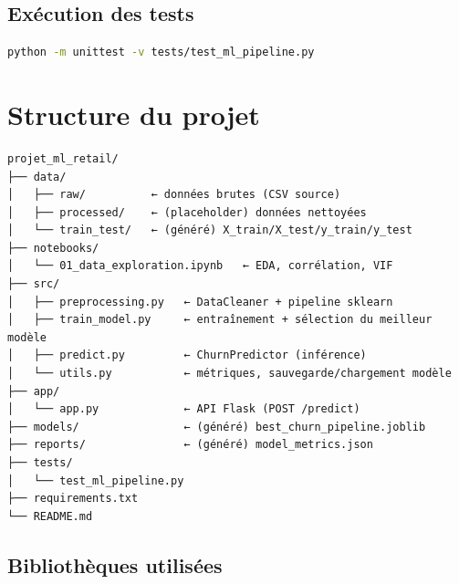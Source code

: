 \documentclass[11pt,a4paper]{article}
\begin{document}
\subsection{Exécution des tests}

\begin{lstlisting}[language=bash, caption=Commande d'exécution des tests]
python -m unittest -v tests/test_ml_pipeline.py
\end{lstlisting}

\section{Structure du projet}

\begin{tcolorbox}[title=Arborescence du projet]
\begin{verbatim}
projet_ml_retail/
├── data/
│   ├── raw/          ← données brutes (CSV source)
│   ├── processed/    ← (placeholder) données nettoyées
│   └── train_test/   ← (généré) X_train/X_test/y_train/y_test
├── notebooks/
│   └── 01_data_exploration.ipynb   ← EDA, corrélation, VIF
├── src/
│   ├── preprocessing.py   ← DataCleaner + pipeline sklearn
│   ├── train_model.py     ← entraînement + sélection du meilleur modèle
│   ├── predict.py         ← ChurnPredictor (inférence)
│   └── utils.py           ← métriques, sauvegarde/chargement modèle
├── app/
│   └── app.py             ← API Flask (POST /predict)
├── models/                ← (généré) best_churn_pipeline.joblib
├── reports/               ← (généré) model_metrics.json
├── tests/
│   └── test_ml_pipeline.py
├── requirements.txt
└── README.md
\end{verbatim}
\end{tcolorbox}

\subsection{Bibliothèques utilisées}
\end{document}
